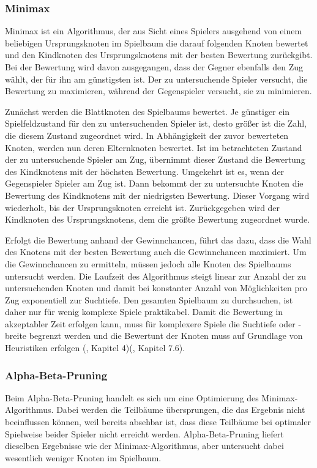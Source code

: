 \subsubsection{Minimax}

Minimax ist ein Algorithmus, der aus Sicht eines Spielers ausgehend von einem beliebigen Ursprungsknoten im Spielbaum die darauf folgenden Knoten bewertet und den Kindknoten des Ursprungsknotens mit der besten Bewertung zurückgibt. Bei der Bewertung wird davon ausgegangen, dass der Gegner ebenfalls den Zug wählt, der für ihn am günstigsten ist. Der zu untersuchende Spieler versucht, die Bewertung zu maximieren, während der Gegenspieler versucht, sie zu minimieren.

Zunächst werden die Blattknoten des Spielbaums bewertet. Je günstiger ein Spielfeldzustand für den zu untersuchenden Spieler ist, desto größer ist die Zahl, die diesem Zustand zugeordnet wird. In Abhängigkeit der zuvor bewerteten Knoten, werden nun deren Elternknoten bewertet. Ist im betrachteten Zustand der zu untersuchende Spieler am Zug, übernimmt dieser Zustand die Bewertung des Kindknotens mit der höchsten Bewertung. Umgekehrt ist es, wenn der Gegenspieler Spieler am Zug ist. Dann bekommt der zu untersuchte Knoten die Bewertung des Kindknotens mit der niedrigsten Bewertung. Dieser Vorgang wird wiederholt, bis der Ursprungsknoten erreicht ist. Zurückgegeben wird der Kindknoten des Ursprungsknotens, dem die größte Bewertung zugeordnet wurde.

Erfolgt die Bewertung anhand der Gewinnchancen, führt das dazu, dass die Wahl des Knotens mit der besten Bewertung auch die Gewinnchancen maximiert. Um die Gewinnchancen zu ermitteln, müssen jedoch alle Knoten des Spielbaums untersucht werden. Die Laufzeit des Algorithmus steigt linear zur Anzahl der zu untersuchenden Knoten und damit bei konstanter Anzahl von Möglichkeiten pro Zug exponentiell zur Suchtiefe. Den gesamten Spielbaum zu durchsuchen, ist daher nur für wenig komplexe Spiele praktikabel. Damit die Bewertung in akzeptabler Zeit erfolgen kann, muss für komplexere Spiele die Suchtiefe oder -breite begrenzt werden und die Bewertunt der Knoten muss auf Grundlage von Heuristiken erfolgen (\cite{Ferguson.January2019}, Kapitel 4)(\cite{Heineman.October2008}, Kapitel 7.6).

\subsubsection{Alpha-Beta-Pruning}

Beim Alpha-Beta-Pruning handelt es sich um eine Optimierung des Minimax-Algorithmus. Dabei werden die Teilbäume übersprungen, die das Ergebnis nicht beeinflussen können, weil bereits absehbar ist, dass diese Teilbäume bei optimaler Spielweise beider Spieler nicht erreicht werden. Alpha-Beta-Pruning liefert dieselben Ergebnisse wie der Minimax-Algorithmus, aber untersucht dabei wesentlich weniger Knoten im Spielbaum.

